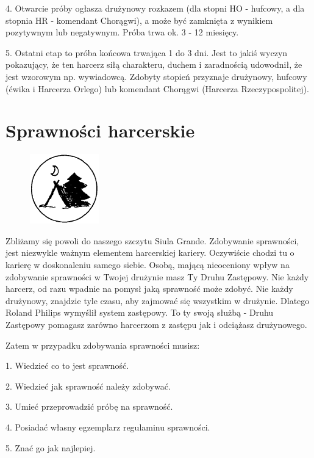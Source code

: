 4.
Otwarcie  próby  ogłasza  drużynowy  rozkazem (dla stopni HO - hufcowy, a dla stopnia HR - komendant  Chorągwi), a może  być  zamknięta   z  wynikiem  pozytywnym lub  negatywnym. Próba  trwa  ok. 3 - 12  miesięcy.

5.
Ostatni etap to próba końcowa trwająca 1 do 3 dni. Jest to jakiś wyczyn pokazujący, że ten  harcerz  siłą  charakteru, duchem i zaradnością  udowodnił,  że  jest  wzorowym   np. wywiadowcą.
Zdobyty  stopień   przyznaje  drużynowy, hufcowy (ćwika  i   Harcerza Orlego) lub komendant  Chorągwi (Harcerza  Rzeczypospolitej).


\section{Sprawności harcerskie}


\begin{figure}
  \begin{center}
    \includegraphics[width=3cm]{grafiki/sprawnosc.png}
  \end{center}
\end{figure} Zbliżamy się powoli do naszego szczytu Siula Grande. Zdobywanie sprawności, jest niezwykle ważnym elementem harcerskiej kariery. Oczywiście chodzi tu o karierę w  doskonaleniu  samego  siebie. Osobą, mającą nieoceniony wpływ na zdobywanie sprawności w Twojej drużynie masz Ty Druhu Zastępowy. Nie każdy harcerz, od razu wpadnie na pomysł jaką sprawność może zdobyć. Nie każdy drużynowy, znajdzie tyle czasu, aby zajmować się wszystkim w drużynie. Dlatego Roland Philips wymyślił system zastępowy. To ty swoją służbą - Druhu  Zastępowy  pomagasz  zarówno harcerzom z zastępu jak i odciążasz drużynowego.

\noindent
	Zatem w przypadku zdobywania sprawności musisz: 

1. Wiedzieć co to jest sprawność.

2. Wiedzieć jak sprawność należy zdobywać.

3. Umieć przeprowadzić próbę na sprawność.

4. Posiadać własny egzemplarz regulaminu sprawności.

5. Znać go jak najlepiej.

